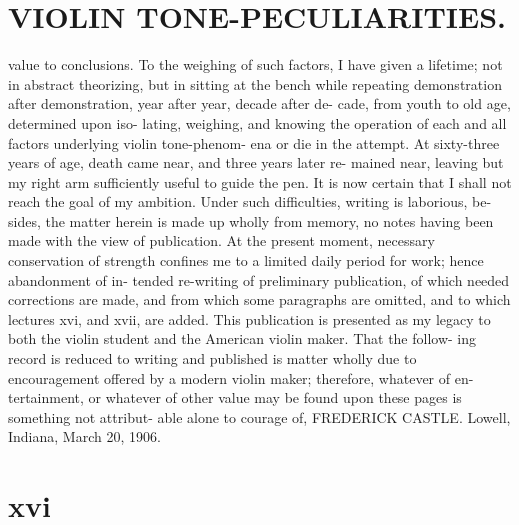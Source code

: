 \documentclass{article}
\begin{document}
\section*{VIOLIN TONE-PECULIARITIES.}
value to conclusions. To the weighing of such factors, I have given a lifetime; not in abstract theorizing, but in sitting at the bench while repeating demonstration after demonstration, year after year, decade after de- cade, from youth to old age, determined upon iso- lating, weighing, and knowing the operation of each and all factors underlying violin tone-phenom- ena or die in the attempt. At sixty-three years of age, death came near, and three years later re- mained near, leaving but my right arm sufficiently useful to guide the pen. It is now certain that I shall not reach the goal of my ambition. Under such difficulties, writing is laborious, be- sides, the matter herein is made up wholly from memory, no notes having been made with the view of publication. At the present moment, necessary conservation of strength confines me to a limited daily period for work; hence abandonment of in- tended re-writing of preliminary publication, of which needed corrections are made, and from which some paragraphs are omitted, and to which lectures xvi, and xvii, are added. This publication is presented as my legacy to both the violin student and the American violin maker. That the follow- ing record is reduced to writing and published is matter wholly due to encouragement offered by a modern violin maker; therefore, whatever of en- tertainment, or whatever of other value may be found upon these pages is something not attribut- able alone to courage of, FREDERICK CASTLE. Lowell, Indiana, March 20, 1906.

\section*{xvi}
\end{document}
